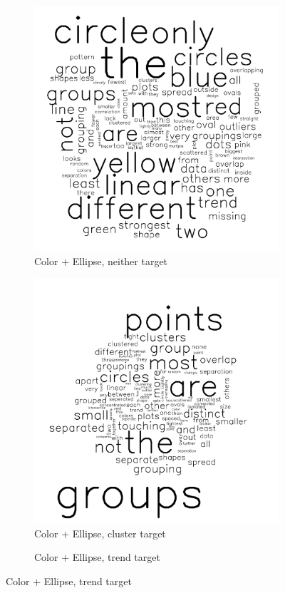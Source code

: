 \documentclass[11pt]{isuthesis}\usepackage[]{graphicx}\usepackage[]{color}
\begin{document}
\begin{figure}[ht]
\begin{subfigure}[t]{0.32\linewidth}\centering
  \caption{Color + Ellipse, neither target}
  \includegraphics[width=.75\linewidth]{fig-sentiment-10}
\end{subfigure}
\begin{subfigure}[t]{0.32\linewidth}\centering
  \caption{Color + Ellipse, cluster target}
  \includegraphics[width=.75\linewidth]{fig-sentiment-11}
\end{subfigure}
\begin{subfigure}[t]{0.32\linewidth}\centering
  \caption{Color + Ellipse, trend target}

\end{subfigure}
\end{figure}
\end{document}
